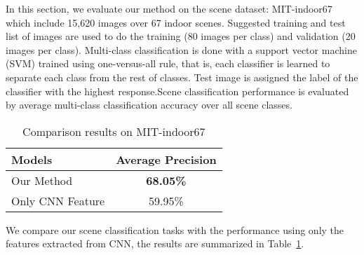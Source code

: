 
In this section, we evaluate our method on the scene dataset: MIT-indoor67~\cite{Quattoni:2009:RIS}
which include 15,620 images over 67 indoor scenes. Suggested training and test
list of images are used to do the training (80 images per class) and validation
(20 images per class).
Multi-class classification is done with a support vector machine (SVM) trained
using one-versus-all rule, that is, each classifier is learned to separate each
class from the rest of classes. Test image is assigned the label of the
classifier with the highest response.Scene classification performance is
evaluated by average multi-class classification accuracy over all scene classes.

\begin{table}[ht]
	\caption{Comparison results on MIT-indoor67}
	\centering
	\begin{tabular}{l c}
	\hline \hline
	Models 			 & Average Precision \\ \hline
	Our Method  	 & {\bf{68.05\%}} \\
	Only CNN Feature & 59.95\%	\\
	\hline
	\end{tabular}
	\label{tab:overall}
\end{table}

We compare our scene classification tasks with the performance using only the
features extracted from CNN, the results are summarized in Table~\ref{tab:overall}.

